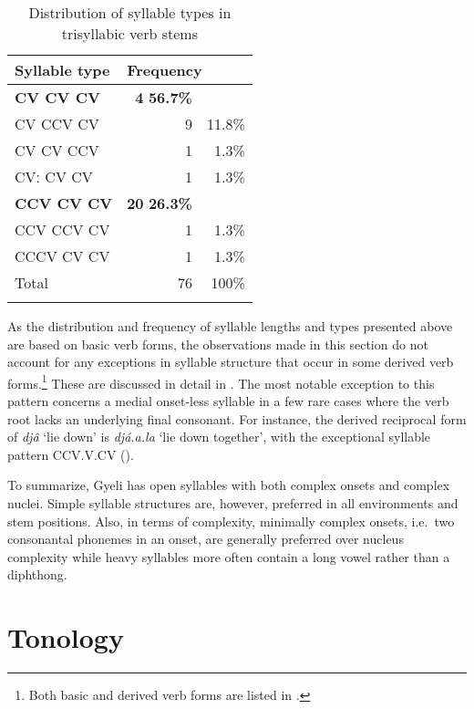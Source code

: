 \begin{table}[t]
\begin{tabularx}{.8\textwidth}{Xrr}
\lsptoprule
Syllable type & \multicolumn{2}{l}{Frequency} \\  \midrule
{\bfseries CV	CV	CV}	&	{\bfseries 4}	{\bfseries 56.7\%} \\
CV	CCV	CV	&	9	& 11.8\% \\
CV	CV	CCV	&	1	& 1.3\% \\
CVː	CV	CV	&	1	& 1.3\% \\
\midrule
{\bfseries CCV	CV	CV}	&	{\bfseries 20}	{\bfseries 26.3\%} \\
CCV	CCV	CV	&	1	& 1.3\% \\
\midrule
CCCV CV	CV	&	1	& 1.3\% \\
 \midrule
Total			&	76	& 100\% \\
\lspbottomrule
\end{tabularx}
\caption{Distribution of syllable types in trisyllabic verb stems}
\label{Tab:o3SyllVerb}
\end{table} 

\largerpage[-1]
As the distribution and frequency of syllable lengths and types presented above are based on basic verb forms, the observations made in this section do not account for any exceptions in syllable structure that occur in some derived verb forms.\footnote{Both basic and derived verb forms are listed in .} These are discussed in detail in . The most notable exception to this pattern concerns a medial onset-less syllable in a few rare cases where the verb root lacks an underlying final consonant.  For instance, the derived reciprocal form of {\itshape djâ} `lie down' is {\itshape djá.a.la} `lie down together', with the exceptional syllable pattern CCV.V.CV ().

To summarize, Gyeli has open syllables with both complex onsets and complex nuclei. Simple syllable structures are, however, preferred in all environments and stem positions. Also, in terms of complexity, minimally complex onsets, i.e.\ two consonantal phonemes in an onset, are generally preferred over nucleus complexity while heavy syllables more often contain a long vowel  rather than a diphthong.






\section{Tonology}
\label{sec:Tonology}

